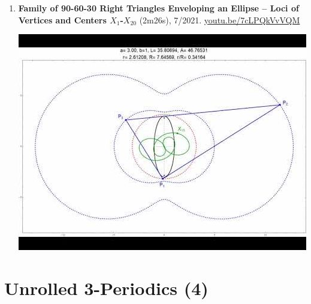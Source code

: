 \documentclass[12pt]{article}
\begin{document}
\begin{enumerate}[resume]
% 
\item \textbf{Family of 90-60-30 Right Triangles Enveloping an Ellipse -- Loci of Vertices and Centers $X_{1}$-$X_{20}$} (2m26s), 7/2021. \href{https://youtu.be/7cLPQkVvVQM}{\url{youtu.be/7cLPQkVvVQM}}
\begin{center}\includegraphics[width=.5\textwidth]{pics/7cLPQkVvVQM.jpg}\end{center}
% 
\end{enumerate}

\section{Unrolled 3-Periodics (4)}
\end{document}
